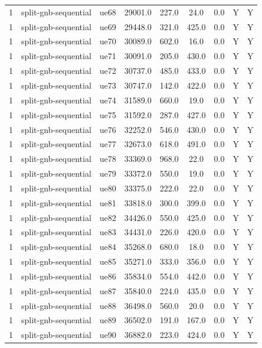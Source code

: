 \begin{table}[ht]
\begin{tabular}{|c|c|c|c|c|c|c|c|c|}
1 & split-gnb-sequential & ue68 & 29001.0 & 227.0 & 24.0 & 0.0 & Y & Y \\
1 & split-gnb-sequential & ue69 & 29448.0 & 321.0 & 425.0 & 0.0 & Y & Y \\
1 & split-gnb-sequential & ue70 & 30089.0 & 602.0 & 16.0 & 0.0 & Y & Y \\
1 & split-gnb-sequential & ue71 & 30091.0 & 205.0 & 430.0 & 0.0 & Y & Y \\
1 & split-gnb-sequential & ue72 & 30737.0 & 485.0 & 433.0 & 0.0 & Y & Y \\
1 & split-gnb-sequential & ue73 & 30747.0 & 142.0 & 422.0 & 0.0 & Y & Y \\
1 & split-gnb-sequential & ue74 & 31589.0 & 660.0 & 19.0 & 0.0 & Y & Y \\
1 & split-gnb-sequential & ue75 & 31592.0 & 287.0 & 427.0 & 0.0 & Y & Y \\
1 & split-gnb-sequential & ue76 & 32252.0 & 546.0 & 430.0 & 0.0 & Y & Y \\
1 & split-gnb-sequential & ue77 & 32673.0 & 618.0 & 491.0 & 0.0 & Y & Y \\
1 & split-gnb-sequential & ue78 & 33369.0 & 968.0 & 22.0 & 0.0 & Y & Y \\
1 & split-gnb-sequential & ue79 & 33372.0 & 550.0 & 19.0 & 0.0 & Y & Y \\
1 & split-gnb-sequential & ue80 & 33375.0 & 222.0 & 22.0 & 0.0 & Y & Y \\
1 & split-gnb-sequential & ue81 & 33818.0 & 300.0 & 399.0 & 0.0 & Y & Y \\
1 & split-gnb-sequential & ue82 & 34426.0 & 550.0 & 425.0 & 0.0 & Y & Y \\
1 & split-gnb-sequential & ue83 & 34431.0 & 226.0 & 420.0 & 0.0 & Y & Y \\
1 & split-gnb-sequential & ue84 & 35268.0 & 680.0 & 18.0 & 0.0 & Y & Y \\
1 & split-gnb-sequential & ue85 & 35271.0 & 333.0 & 356.0 & 0.0 & Y & Y \\
1 & split-gnb-sequential & ue86 & 35834.0 & 554.0 & 442.0 & 0.0 & Y & Y \\
1 & split-gnb-sequential & ue87 & 35840.0 & 224.0 & 435.0 & 0.0 & Y & Y \\
1 & split-gnb-sequential & ue88 & 36498.0 & 560.0 & 20.0 & 0.0 & Y & Y \\
1 & split-gnb-sequential & ue89 & 36502.0 & 191.0 & 167.0 & 0.0 & Y & Y \\
1 & split-gnb-sequential & ue90 & 36882.0 & 223.0 & 424.0 & 0.0 & Y & Y \\

\end{tabular}
\end{table}
